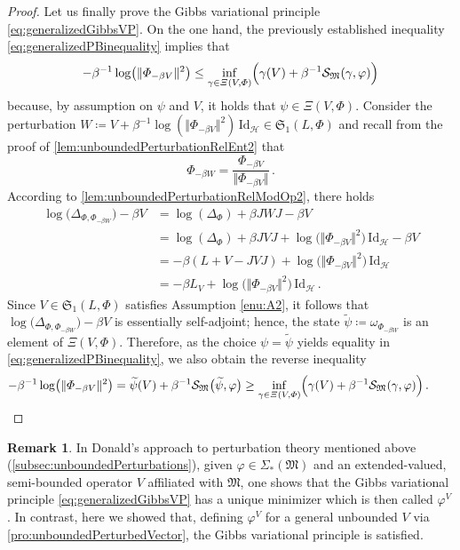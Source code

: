 \documentclass[a4paper, twoside, 11pt, reqno]{amsart}
\theoremstyle{definition}
\newtheorem{remark}[definition]{Remark}
\theoremstyle{plain}
\renewcommand{\Delta}{\varDelta}
\renewcommand{\Xi}{\varXi}
\renewcommand{\Sigma}{\varSigma}
\renewcommand{\Phi}{\varPhi}
\newcommand{\MH}{\mathcal{H}}
\newcommand{\MS}{\mathcal{S}}
\newcommand{\MFM}{\mathfrak{M}}
\newcommand{\MFS}{\mathfrak{S}}
\newcommand{\NS}[1]{\Sigma_{\ast}(#1)}
\newcommand{\id}{\mathrm{Id}}
\newcommand{\1}{\mathbf{1}}
\newcommand{\norm}[2][]{#1\Vert{#2}#1\Vert}
\newcommand{\ce}{\coloneqq}
\newcommand{\wt}[1]{\widetilde{#1}}
\newcommand{\inv}[1]{#1^{-1}}
\begin{document}
\begin{proof}
    Let us finally prove the Gibbs variational principle \eqref{eq:generalizedGibbsVP}. On the one hand, the previously established inequality \eqref{eq:generalizedPBinequality} implies that
    \begin{equation*}
        - \inv{\beta} \log \bigl(\norm{\Phi_{- \beta V}}^2\bigr) \le \inf_{\gamma \in \Xi(V, \Phi)} \Bigl(\gamma(V) + \inv{\beta} \MS_\MFM(\gamma, \varphi)\Bigr)
    \end{equation*}
    because, by assumption on $\psi$ and $V$, it holds that $\psi \in \Xi(V, \Phi)$. Consider the perturbation $W \ce V + \inv{\beta} \log (\norm{\Phi_{- \beta V}}^2) \, \id_\MH \in \MFS_1(L, \Phi)$ and recall from the proof of \cref{lem:unboundedPerturbationRelEnt2} that
    \begin{equation*}
        \Phi_{- \beta W} = \frac{\Phi_{- \beta V}}{\norm{\Phi_{- \beta V}}} \, .
    \end{equation*}
    According to \cref{lem:unboundedPerturbationRelModOp2}, there holds
    \begin{align*}
        \log \bigl(\Delta_{\Phi, \Phi_{- \beta W}}\bigr) - \beta V &= \log(\Delta_\Phi) + \beta J W J - \beta V \\
        &= \log(\Delta_\Phi) + \beta J V J + \log \bigl(\norm{\Phi_{- \beta V}}^2\bigr) \, \id_\MH - \beta V \\
        &= - \beta (L + V - J V J) + \log \bigl(\norm{\Phi_{- \beta V}}^2\bigr) \, \id_\MH \\
        &= - \beta L_V + \log \bigl(\norm{\Phi_{- \beta V}}^2\bigr) \, \id_\MH \, .
    \end{align*}
    Since $V \in \MFS_1(L, \Phi)$ satisfies Assumption \ref{enu:A2}, it follows that $\log \bigl(\Delta_{\Phi, \Phi_{- \beta W}}\bigr) - \beta V$ is essentially self-adjoint; hence, the state $\wt{\psi} \ce \omega_{\Phi_{- \beta W}}$ is an element of $\Xi(V, \Phi)$. Therefore, as the choice $\psi = \wt{\psi}$ yields equality in \cref{eq:generalizedPBinequality}, we also obtain the reverse inequality
    \begin{equation*}
        - \inv{\beta} \log \bigl(\norm{\Phi_{- \beta V}}^2\bigr) = \wt{\psi}(V) + \inv{\beta} \MS_\MFM\bigl(\wt{\psi}, \varphi\bigr) \ge \inf_{\gamma \in \Xi(V, \Phi)} \Bigl(\gamma(V) + \inv{\beta} \MS_\MFM(\gamma, \varphi)\Bigr) \, . \tag*{\qedhere}
    \end{equation*}
\end{proof}

\begin{remark}
    In Donald's approach \cite{Donald1990} to perturbation theory mentioned above (\cref{subsec:unboundedPerturbations}), given $\varphi \in \NS{\MFM}$ and an extended-valued, semi-bounded operator $V$ affiliated with $\MFM$, one shows that the Gibbs variational principle \eqref{eq:generalizedGibbsVP} has a unique minimizer which is then called $\varphi^V$ \cite[Thm. 3.1]{Donald1990}. In contrast, here we showed that, defining $\varphi^V$ for a general unbounded $V$ via \cref{pro:unboundedPerturbedVector}, the Gibbs variational principle is satisfied.
\end{remark}
\end{document}
